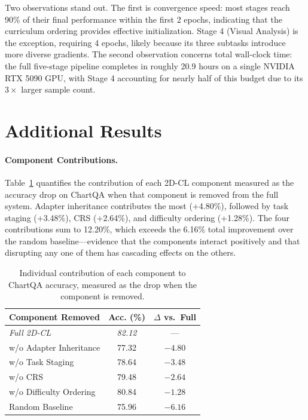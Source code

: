 \documentclass[journal]{IEEEtran}
\newcommand{\method}{2D-CL}
\newcommand{\crs}{CRS}
\begin{document}
Two observations stand out. The first is convergence speed: most stages reach 90\% of their final performance within the first 2 epochs, indicating that the curriculum ordering provides effective initialization. Stage 4 (Visual Analysis) is the exception, requiring 4 epochs, likely because its three subtasks introduce more diverse gradients. The second observation concerns total wall-clock time: the full five-stage pipeline completes in roughly 20.9 hours on a single NVIDIA RTX 5090 GPU, with Stage 4 accounting for nearly half of this budget due to its $3\times$ larger sample count.

\section{Additional Results}
\paragraph{Component Contributions.}
Table~\ref{tab:component_detail} quantifies the contribution of each \method{} component measured as the accuracy drop on ChartQA when that component is removed from the full system. Adapter inheritance contributes the most (+4.80\%), followed by task staging (+3.48\%), \crs{} (+2.64\%), and difficulty ordering (+1.28\%). The four contributions sum to 12.20\%, which exceeds the 6.16\% total improvement over the random baseline---evidence that the components interact positively and that disrupting any one of them has cascading effects on the others.

\begin{table}[!t]
\centering
\small
\begin{tabular}{lcc}
\toprule
\textbf{Component Removed} & \textbf{Acc. (\%)} & \textbf{$\Delta$ vs.\ Full} \\
\midrule
\textit{Full \method{}} & \textit{82.12} & --- \\
\midrule
w/o Adapter Inheritance & 77.32 & $-4.80$ \\
w/o Task Staging & 78.64 & $-3.48$ \\
w/o CRS & 79.48 & $-2.64$ \\
w/o Difficulty Ordering & 80.84 & $-1.28$ \\
\midrule
Random Baseline & 75.96 & $-6.16$ \\
\bottomrule
\end{tabular}
\caption{Individual contribution of each component to ChartQA accuracy, measured as the drop when the component is removed.}
\label{tab:component_detail}
\end{table}
\end{document}
